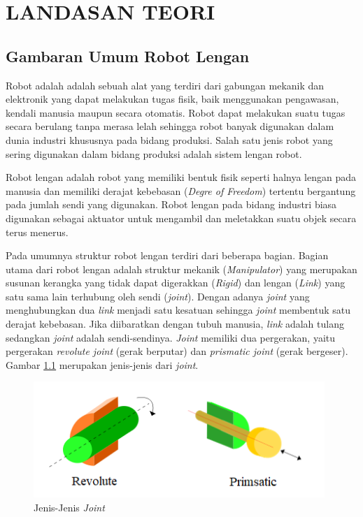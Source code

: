 \chapter{LANDASAN TEORI}

\section{Gambaran Umum Robot Lengan}

Robot adalah adalah sebuah alat yang terdiri dari gabungan mekanik dan elektronik yang dapat melakukan tugas fisik, baik menggunakan pengawasan, kendali manusia maupun secara otomatis. Robot dapat melakukan suatu tugas secara berulang tanpa merasa lelah sehingga robot banyak digunakan dalam dunia industri khususnya pada bidang produksi. Salah satu jenis robot yang sering digunakan dalam bidang produksi adalah sistem lengan robot.

Robot lengan adalah robot yang memiliki bentuk fisik seperti halnya lengan pada manusia dan memiliki derajat kebebasan (\emph{Degre of Freedom}) tertentu bergantung pada jumlah sendi yang digunakan. Robot lengan pada bidang industri biasa digunakan sebagai aktuator untuk mengambil dan meletakkan suatu objek secara terus menerus.
	

Pada umumnya struktur robot lengan terdiri dari beberapa bagian.  Bagian utama dari robot lengan adalah struktur mekanik ({\textit{Manipulator}}) yang merupakan susunan kerangka yang tidak dapat digerakkan (\emph{Rigid}) dan lengan (\emph{Link}) yang satu sama lain terhubung oleh sendi (\emph {joint}). Dengan adanya \emph{joint} yang menghubungkan dua \emph{link} menjadi satu kesatuan sehingga \emph{joint} membentuk satu derajat kebebasan. Jika diibaratkan dengan tubuh manusia, \emph{link} adalah tulang sedangkan \emph{joint} adalah sendi-sendinya. \emph{Joint} memiliki dua pergerakan, yaitu pergerakan \emph{revolute joint} (gerak berputar) dan \emph{prismatic joint} (gerak bergeser). Gambar \ref{pic.jenisjoint} merupakan jenis-jenis dari \textit{joint}.

	\begin{figure}[H]
	\centering
	\includegraphics[width=11cm]{gambar/joint.png}
	\caption{Jenis-Jenis \textit{Joint}}
	\label{pic.jenisjoint}
\end{figure}


